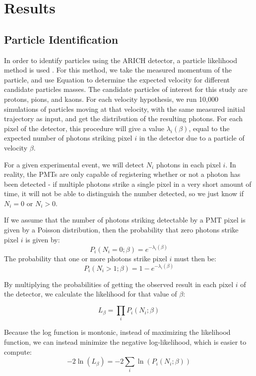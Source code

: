 
\chapter{Results}
\label{ch:Results}
\section{Particle Identification}
\label{sec:particleIdentification}
In order to identify particles using the \ac{ARICH} detector, a particle likelihood method is used \cite{richImpact, belleArich}.
For this method, we take the measured momentum of the particle, and use Equation  to determine the expected velocity for different candidate particles masses.
The candidate particles of interest for this study are protons, pions, and kaons.
For each velocity hypothesis, we run 10,000 simulations of particles moving at that velocity, with the same measured initial trajectory as input, and get the distribution of the resulting photons.
For each pixel of the detector, this procedure will give a value $\lambda_i(\beta)$, equal to the expected number of photons striking pixel $i$ in the detector due to a particle of velocity $\beta$. 

For a given experimental event, we will detect $N_i$ photons in each pixel $i$.
In reality, the PMTs are only capable of registering whether or not a photon has been detected - if multiple photons strike a single pixel in a very short amount of time, it will not be able to distinguish the number detected, so we just know if $N_i = 0$ or $N_i > 0$.

If we assume that the number of photons striking detectable by a PMT pixel is given by a Poisson distribution, then the probability that zero photons strike pixel $i$ is given by:
$$ P_i(N_i=0; \beta) = e^{-\lambda_i(\beta)} $$
 The probability that one or more photons strike pixel $i$ must then be:
$$ P_i(N_i>1; \beta) = 1 - e^{-\lambda_i(\beta)} $$

By multiplying the probabilities of getting the observed result in each pixel $i$ of the detector, we calculate the likelihood for that value of $\beta$:

$$L_\beta = \prod_{i}P_i(N_i; \beta)$$

Because the log function is montonic, instead of maximizing the likelihood function, we can instead minimize the negative log-likelihood, which is easier to compute:
\begin{equation}
    \label{eq:loglikelihood}
    -2\ln(L_\beta) = -2\sum_i \ln(P_i(N_i; \beta))
\end{equation}

